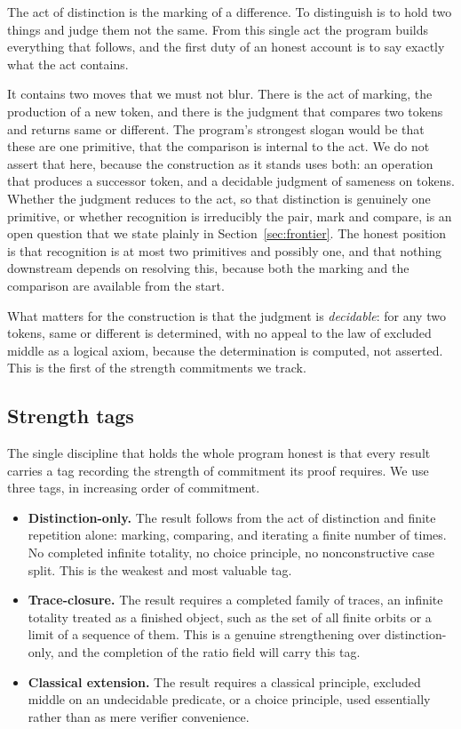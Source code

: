 \documentclass[11pt,a4paper]{article}
\theoremstyle{definition}
\theoremstyle{remark}
\begin{document}
The act of distinction is the marking of a difference. To distinguish is to hold
two things and judge them not the same. From this single act the program builds
everything that follows, and the first duty of an honest account is to say
exactly what the act contains.

It contains two moves that we must not blur. There is the act of marking, the
production of a new token, and there is the judgment that compares two tokens and
returns same or different. The program's strongest slogan would be that these are
one primitive, that the comparison is internal to the act. We do not assert that
here, because the construction as it stands uses both: an operation that produces
a successor token, and a decidable judgment of sameness on tokens. Whether the
judgment reduces to the act, so that distinction is genuinely one primitive, or
whether recognition is irreducibly the pair, mark and compare, is an open
question that we state plainly in Section~\ref{sec:frontier}. The honest position
is that recognition is at most two primitives and possibly one, and that nothing
downstream depends on resolving this, because both the marking and the comparison
are available from the start.

What matters for the construction is that the judgment is \emph{decidable}: for
any two tokens, same or different is determined, with no appeal to the law of
excluded middle as a logical axiom, because the determination is computed, not
asserted. This is the first of the strength commitments we track.

\subsection{Strength tags}

The single discipline that holds the whole program honest is that every result
carries a tag recording the strength of commitment its proof requires. We use
three tags, in increasing order of commitment.

\begin{itemize}[leftmargin=2em]
  \item \textbf{Distinction-only.} The result follows from the act of
    distinction and finite repetition alone: marking, comparing, and iterating a
    finite number of times. No completed infinite totality, no choice principle,
    no nonconstructive case split. This is the weakest and most valuable tag.
  \item \textbf{Trace-closure.} The result requires a completed family of traces,
    an infinite totality treated as a finished object, such as the set of all
    finite orbits or a limit of a sequence of them. This is a genuine strengthening
    over distinction-only, and the completion of the ratio field will carry this
    tag.
  \item \textbf{Classical extension.} The result requires a classical principle,
    excluded middle on an undecidable predicate, or a choice principle, used
    essentially rather than as mere verifier convenience.
\end{itemize}
\end{document}
